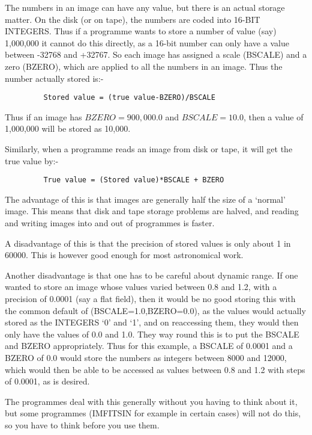 The numbers in an image can have any value, but there is an
actual storage matter. On the disk (or on tape), the
numbers are coded into 16-BIT INTEGERS. Thus if a programme
wants to store a number of value (say) 1,000,000 it cannot
do this directly, as a 16-bit number can only have a value
between -32768 and +32767. So each image has assigned
a scale (BSCALE) and a zero (BZERO), which are applied to all
the numbers in an image. Thus the number actually
stored is:-

\begin{verbatim}
         Stored value = (true value-BZERO)/BSCALE
\end{verbatim}

Thus if an image has $BZERO=900,000.0$ and $BSCALE=10.0$, then
a value of 1,000,000 will be stored as 10,000.
  
Similarly, when a programme reads an image from disk or tape,
it will get the true value by:-

\begin{verbatim}
         True value = (Stored value)*BSCALE + BZERO
\end{verbatim}

The advantage of this is that images are generally half the
size of a `normal' image. This means that disk and tape
storage problems are halved, and reading and writing images
into and out of programmes is faster.

A disadvantage of this is that the precision of stored values is
only about 1 in 60000. This is however good enough for most 
astronomical work.

Another disadvantage is that one has to be careful about
dynamic range. If one wanted to store an image whose values
varied between 0.8 and 1.2, with a precision of 0.0001 (say a
flat field), then it would be no good storing this with
the common default of (BSCALE=1.0,BZERO=0.0), as the values
would actually stored as the INTEGERS `0' and `1', and on
reaccessing them, they would then only have the values
of 0.0 and 1.0. They way round this is to put the BSCALE
and BZERO appropriately. Thus for this example, a BSCALE of
0.0001 and a BZERO of 0.0 would store the numbers as integers
between 8000 and 12000, which would then be able to be
accessed as values between 0.8 and 1.2 with steps of 0.0001,
as is desired.

The programmes deal with this generally without you having
to think about it, but some programmes (IMFITSIN for example in
certain cases) will not do this, so you have to think before you 
use them. 

